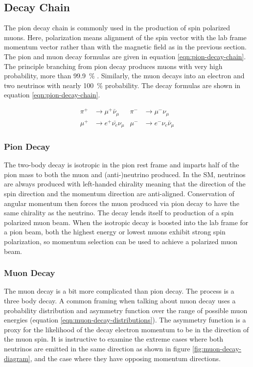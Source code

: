\subsection{Decay Chain}

The pion decay chain is commonly used in the production of spin polarized muons.  Here, polarization means alignment of the spin vector with the lab frame momentum vector rather than with the magnetic field as in the previous section.  The pion and muon decay formulas are given in equation \ref{eqn:pion-decay-chain}.  The principle branching from pion decay produces muons with very high probability, more than \SI{99.9}{\percent} \cite{pdg-2016}.  Similarly, the muon decays into an electron and two neutrinos with nearly \SI{100}{\percent} probability.  The decay formulas are shown in equation \ref{eqn:pion-decay-chain}.

\begin{align}
\label{eqn:pion-decay-chain}
\pi^+ & \rightarrow \mu^+ \bar{\nu}_\mu  & \pi^- & \rightarrow \mu^- \nu_\mu \\
\mu^+ & \rightarrow e^+ \bar{\nu_e} \nu_\mu  & \mu^- & \rightarrow e^- \nu_e \bar{\nu}_\mu 
\end{align}

\subsubsection{Pion Decay}

The two-body decay is isotropic in the pion rest frame and imparts half of the pion mass to both the muon and (anti-)neutrino produced.  In the SM, neutrinos are always produced with left-handed chirality meaning that the direction of the spin direction and the momentum direction are anti-aligned.  Conservation of angular momentum then forces the muon produced via pion decay to have the same chirality as the neutrino.  The decay lends itself to production of a spin polarized muon beam.  When the isotropic decay is boosted into the lab frame for a pion beam, both the highest energy or lowest muons exhibit strong spin polarization, so momentum selection can be used to achieve a polarized muon beam. 

\subsubsection{Muon Decay}

The muon decay is a bit more complicated than pion decay.  The process is a three body decay.  A common framing when talking about muon decay uses a probability distribution and asymmetry function over the range of possible muon energies (equation \ref{eqn:muon-decay-distributions}).  The asymmetry function is a proxy for the likelihood of the decay electron momentum to be in the direction of the muon spin.  It is instructive to examine the extreme cases where both neutrinos are emitted in the same direction as shown in figure \ref{fig:muon-decay-diagram}, and the case where they have opposing momentum directions. 


